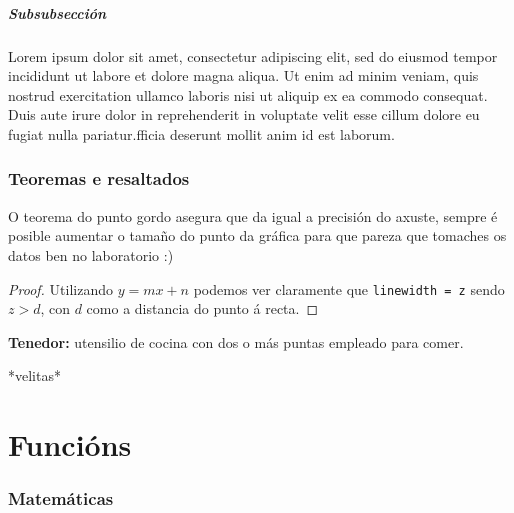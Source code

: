 \documentclass[12pt, titlepage]{article}
\begin{document}
    \subsubsection{Subsubsección}

    Lorem ipsum dolor sit amet, consectetur adipiscing elit, sed do eiusmod tempor incididunt ut labore et dolore magna aliqua. Ut enim ad minim veniam, quis nostrud exercitation ullamco laboris nisi ut aliquip ex ea commodo consequat. Duis aute irure dolor in reprehenderit in voluptate velit esse cillum dolore eu fugiat nulla pariatur.fficia deserunt mollit anim id est laborum.

    \section{Teoremas e resaltados}

    \begin{theorem}
        O teorema do punto gordo asegura que da igual a precisión do axuste, sempre é posible aumentar o tamaño do punto da gráfica para que pareza que tomaches os datos ben no laboratorio :)
    \end{theorem}

    \begin{proof}
        Utilizando $y = mx + n$ podemos ver claramente que \texttt{linewidth = z} sendo $z > d$, con $d$ como a distancia do punto á recta.
    \end{proof}

    \begin{definition}
        \textbf{Tenedor:} utensilio de cocina con dos o más puntas empleado para comer.
    \end{definition}

    \begin{example}
        *velitas*
    \end{example}


    \newpage
    \part{Funcións}

    \section{Matemáticas}
\end{document}
